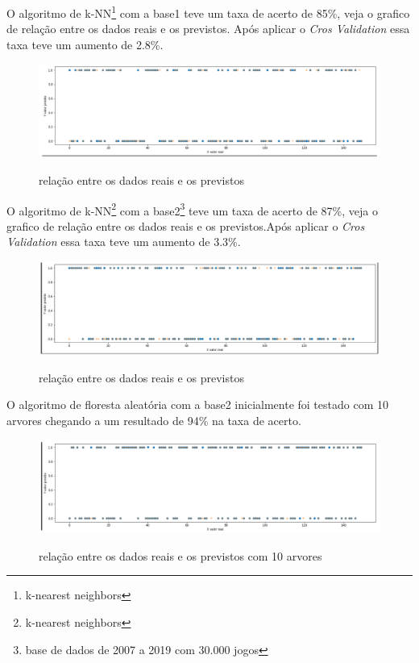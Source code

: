 O algoritmo de k-NN\footnote[3]{k-nearest neighbors} com a base1 teve um taxa de acerto de 85\%, veja o grafico de relação entre os dados reais e os previstos. Após aplicar o \textit{Cros Validation} essa taxa teve um aumento de 2.8\%.
\begin{figure}[htbp]
	\begin{center}
		\includegraphics[width=0.7\linewidth]{imagens/knn.png}\\
	\end{center}
	\caption[relação entre os dados reais e os previstos]{relação entre os dados reais e os previstos}
	\label{fig:logo}
\end{figure}

O algoritmo de k-NN\footnote[3]{k-nearest neighbors} com a base2\footnote[5]{base de dados de 2007 a 2019 com 30.000 jogos} teve um taxa de acerto de 87\%, veja o grafico de relação entre os dados reais e os previstos.Após aplicar o \textit{Cros Validation} essa taxa teve um aumento de 3.3\%.
\begin{figure}[htbp]
	\begin{center}
		\includegraphics[width=0.7\linewidth]{imagens/knnAPI.png}\\
	\end{center}
	\caption[relação entre os dados reais e os previstos]{relação entre os dados reais e os previstos}
	\label{fig:logo}
\end{figure}

O algoritmo de floresta aleatória com a base2 inicialmente foi testado com 10 arvores chegando a um resultado de 94\% na taxa de acerto.
\begin{figure}[htbp]
	\begin{center}
		\includegraphics[width=0.7\linewidth]{imagens/florestaaleatoria.png}\\
	\end{center}
	\caption[relação entre os dados reais e os previstos com 10 arvores]{relação entre os dados reais e os previstos com 10 arvores}
	\label{fig:logo}
\end{figure}

